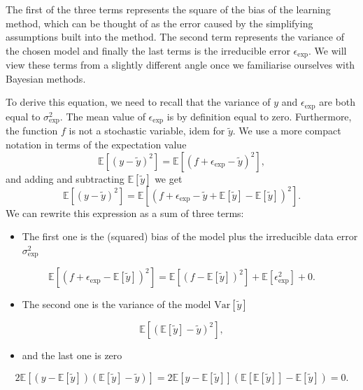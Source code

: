 \documentclass[%
oneside,                 %
final,                   %
10pt]{article}
\begin{document}
The first of the three terms represents the square of the bias of the learning
method, which can be thought of as the error caused by the simplifying
assumptions built into the method. The second term represents the
variance of the chosen model and finally the last terms is the irreducible error $\epsilon_\mathrm{exp}$. We will view these terms from a slightly different angle once we familiarise ourselves with Bayesian methods.

To derive this equation, we need to recall that the variance of $y$ and $\epsilon_\mathrm{exp}$ are both equal to $\sigma^2_\mathrm{exp}$. The mean value of $\epsilon_\mathrm{exp}$ is by definition equal to zero. Furthermore, the function $f$ is not a stochastic variable, idem for $\tilde{y}$.
We use a more compact notation in terms of the expectation value 
\[
\mathbb{E}\left[(y-\tilde{y})^2\right]=\mathbb{E}\left[({f}+\epsilon_\mathrm{exp}-\tilde{y})^2\right],
\]
and adding and subtracting $\mathbb{E}\left[\tilde{y}\right]$ we get
\[
\mathbb{E}\left[(y-\tilde{y})^2\right]=\mathbb{E}\left[({f}+\epsilon_\mathrm{exp}-\tilde{y}+\mathbb{E}\left[\tilde{y}\right]-\mathbb{E}\left[\tilde{y}\right])^2\right].
\]
We can rewrite this expression as a sum of three terms:
\begin{itemize}
\item The first one is the (squared) bias of the model plus the irreducible data error $\sigma_\mathrm{exp}^2$
\end{itemize}

\noindent
\[
\mathbb{E}\left[({f}+\epsilon_\mathrm{exp}-\mathbb{E}\left[\tilde{y}\right])^2\right] = \mathbb{E}\left[({f}-\mathbb{E}\left[\tilde{y}\right])^2\right] + \mathbb{E}\left[\epsilon_\mathrm{exp}^2\right]+0.
\]
\begin{itemize}
\item The second one is the variance of the model $\mathrm{Var}\left[ \tilde{y} \right]$
\end{itemize}

\noindent
\[
\mathbb{E}\left[(\mathbb{E}\left[\tilde{y}\right] - \tilde{y})^2\right],
\]
\begin{itemize}
\item and the last one is zero
\end{itemize}

\noindent
\[
2\mathbb{E}\left[(y-\mathbb{E}\left[\tilde{y}\right])(\mathbb{E}\left[\tilde{y}\right]-\tilde{y})\right] = 2\mathbb{E}\left[y-\mathbb{E}\left[\tilde{y}\right]\right] \left( \mathbb{E}\left[\mathbb{E}\left[\tilde{y}\right]\right] - \mathbb{E}\left[\tilde{y}\right]\right) = 0.
\]
\end{document}
